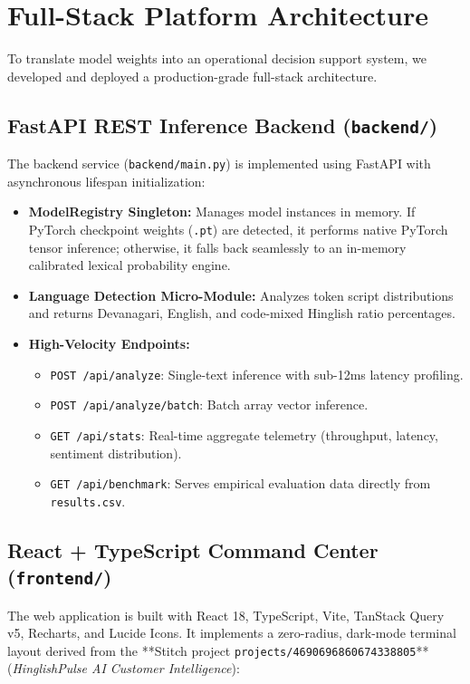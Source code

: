 \documentclass[11pt,a4paper]{article}
\begin{document}
\section{Full-Stack Platform Architecture}

To translate model weights into an operational decision support system, we developed and deployed a production-grade full-stack architecture.

\subsection{FastAPI REST Inference Backend (\texttt{backend/})}
The backend service (\texttt{backend/main.py}) is implemented using FastAPI with asynchronous lifespan initialization:
\begin{itemize}
    \item \textbf{ModelRegistry Singleton:} Manages model instances in memory. If PyTorch checkpoint weights (\texttt{.pt}) are detected, it performs native PyTorch tensor inference; otherwise, it falls back seamlessly to an in-memory calibrated lexical probability engine.
    \item \textbf{Language Detection Micro-Module:} Analyzes token script distributions and returns Devanagari, English, and code-mixed Hinglish ratio percentages.
    \item \textbf{High-Velocity Endpoints:}
    \begin{itemize}
        \item \texttt{POST /api/analyze}: Single-text inference with sub-12ms latency profiling.
        \item \texttt{POST /api/analyze/batch}: Batch array vector inference.
        \item \texttt{GET  /api/stats}: Real-time aggregate telemetry (throughput, latency, sentiment distribution).
        \item \texttt{GET  /api/benchmark}: Serves empirical evaluation data directly from \texttt{results.csv}.
    \end{itemize}
\end{itemize}

\subsection{React + TypeScript Command Center (\texttt{frontend/})}
The web application is built with React 18, TypeScript, Vite, TanStack Query v5, Recharts, and Lucide Icons. It implements a zero-radius, dark-mode terminal layout derived from the **Stitch project \texttt{projects/4690696860674338805}** (\textit{HinglishPulse AI Customer Intelligence}):
\end{document}
